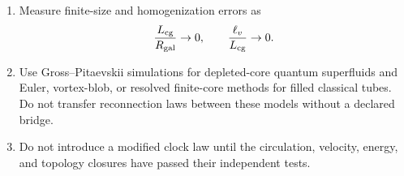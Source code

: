 \begin{enumerate}
\item
Measure finite-size and homogenization errors as
\[
\frac{L_{\rm cg}}{R_{\rm gal}}\rightarrow0,
\qquad
\frac{\ell_v}{L_{\rm cg}}\rightarrow0.
\]

\item
Use Gross--Pitaevskii simulations for depleted-core quantum superfluids and
Euler, vortex-blob, or resolved finite-core methods for filled classical
tubes.  Do not transfer reconnection laws between these models without a
declared bridge.

\item
Do not introduce a modified clock law until the circulation, velocity,
energy, and topology closures have passed their independent tests.

\end{enumerate}

